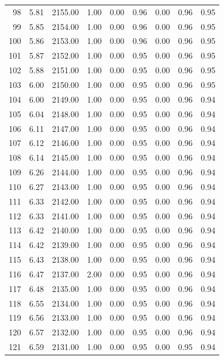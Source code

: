 \documentclass{article}\usepackage[]{graphicx}\usepackage[]{color}
\begin{document}
\begin{longtable}{rrrrrrrrr}
  98 & 5.81 & 2155.00 & 1.00 & 0.00 & 0.96 & 0.00 & 0.96 & 0.95 \\ 
  99 & 5.85 & 2154.00 & 1.00 & 0.00 & 0.96 & 0.00 & 0.96 & 0.95 \\ 
  100 & 5.86 & 2153.00 & 1.00 & 0.00 & 0.96 & 0.00 & 0.96 & 0.95 \\ 
  101 & 5.87 & 2152.00 & 1.00 & 0.00 & 0.95 & 0.00 & 0.96 & 0.95 \\ 
  102 & 5.88 & 2151.00 & 1.00 & 0.00 & 0.95 & 0.00 & 0.96 & 0.95 \\ 
  103 & 6.00 & 2150.00 & 1.00 & 0.00 & 0.95 & 0.00 & 0.96 & 0.95 \\ 
  104 & 6.00 & 2149.00 & 1.00 & 0.00 & 0.95 & 0.00 & 0.96 & 0.94 \\ 
  105 & 6.04 & 2148.00 & 1.00 & 0.00 & 0.95 & 0.00 & 0.96 & 0.94 \\ 
  106 & 6.11 & 2147.00 & 1.00 & 0.00 & 0.95 & 0.00 & 0.96 & 0.94 \\ 
  107 & 6.12 & 2146.00 & 1.00 & 0.00 & 0.95 & 0.00 & 0.96 & 0.94 \\ 
  108 & 6.14 & 2145.00 & 1.00 & 0.00 & 0.95 & 0.00 & 0.96 & 0.94 \\ 
  109 & 6.26 & 2144.00 & 1.00 & 0.00 & 0.95 & 0.00 & 0.96 & 0.94 \\ 
  110 & 6.27 & 2143.00 & 1.00 & 0.00 & 0.95 & 0.00 & 0.96 & 0.94 \\ 
  111 & 6.33 & 2142.00 & 1.00 & 0.00 & 0.95 & 0.00 & 0.96 & 0.94 \\ 
  112 & 6.33 & 2141.00 & 1.00 & 0.00 & 0.95 & 0.00 & 0.96 & 0.94 \\ 
  113 & 6.42 & 2140.00 & 1.00 & 0.00 & 0.95 & 0.00 & 0.96 & 0.94 \\ 
  114 & 6.42 & 2139.00 & 1.00 & 0.00 & 0.95 & 0.00 & 0.96 & 0.94 \\ 
  115 & 6.43 & 2138.00 & 1.00 & 0.00 & 0.95 & 0.00 & 0.96 & 0.94 \\ 
  116 & 6.47 & 2137.00 & 2.00 & 0.00 & 0.95 & 0.00 & 0.96 & 0.94 \\ 
  117 & 6.48 & 2135.00 & 1.00 & 0.00 & 0.95 & 0.00 & 0.96 & 0.94 \\ 
  118 & 6.55 & 2134.00 & 1.00 & 0.00 & 0.95 & 0.00 & 0.96 & 0.94 \\ 
  119 & 6.56 & 2133.00 & 1.00 & 0.00 & 0.95 & 0.00 & 0.96 & 0.94 \\ 
  120 & 6.57 & 2132.00 & 1.00 & 0.00 & 0.95 & 0.00 & 0.96 & 0.94 \\ 
  121 & 6.59 & 2131.00 & 1.00 & 0.00 & 0.95 & 0.00 & 0.95 & 0.94 \\ 

\end{longtable}
\end{document}
